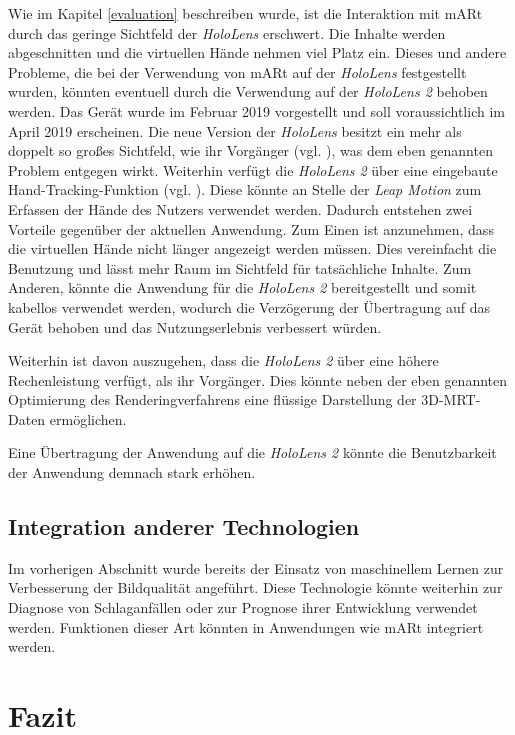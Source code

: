 Wie im Kapitel \ref{evaluation} beschreiben wurde, ist die Interaktion mit mARt durch das geringe Sichtfeld der \textit{HoloLens} erschwert. Die Inhalte werden abgeschnitten und die virtuellen Hände nehmen viel Platz ein. 
Dieses und andere Probleme, die bei der Verwendung von mARt auf der \textit{HoloLens} festgestellt wurden, könnten eventuell durch die Verwendung auf der \textit{HoloLens 2} behoben werden. 
Das Gerät wurde im Februar 2019 vorgestellt und soll voraussichtlich im April 2019 erscheinen. 
Die neue Version der \textit{HoloLens} besitzt ein mehr als doppelt so großes Sichtfeld, wie ihr Vorgänger (vgl. \cite{hololens2}), was dem eben genannten Problem entgegen wirkt. 
Weiterhin verfügt die \textit{HoloLens 2} über eine eingebaute Hand-Tracking-Funktion (vgl. \cite{hololens2}). Diese könnte an Stelle der \textit{Leap Motion} zum Erfassen der Hände des Nutzers verwendet werden. Dadurch entstehen zwei Vorteile gegenüber der aktuellen Anwendung. Zum Einen ist anzunehmen, dass die virtuellen Hände nicht länger angezeigt werden müssen. Dies vereinfacht die Benutzung und lässt mehr Raum im Sichtfeld für tatsächliche Inhalte. Zum Anderen, könnte die Anwendung für die \textit{HoloLens 2} bereitgestellt und somit kabellos verwendet werden, wodurch die Verzögerung der Übertragung auf das Gerät behoben und das Nutzungserlebnis verbessert würden. 

Weiterhin ist davon auszugehen, dass die \textit{HoloLens 2} über eine höhere Rechenleistung verfügt, als ihr Vorgänger. Dies könnte neben der eben genannten Optimierung des Renderingverfahrens eine flüssige Darstellung der 3D-MRT-Daten ermöglichen.

Eine Übertragung der Anwendung auf die \textit{HoloLens 2} könnte die Benutzbarkeit der Anwendung demnach stark erhöhen.

\subsection{Integration anderer Technologien}

Im vorherigen Abschnitt wurde bereits der Einsatz von maschinellem Lernen zur Verbesserung der Bildqualität angeführt. Diese Technologie könnte weiterhin zur Diagnose von Schlaganfällen oder zur Prognose ihrer Entwicklung verwendet werden. Funktionen dieser Art könnten in Anwendungen wie mARt  integriert werden.

\section{Fazit}

